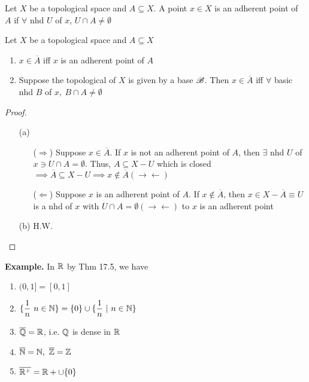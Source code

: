 \begin{defn}
	Let $X$ be a topological space and $A \subseteq X$. A point $x \in X$ is an adherent point of $A$ if $\forall$ nhd $U$ of $x$, $U \cap A \neq \emptyset$ 
\end{defn}

\begin{thm*}[17.5]
	Let $X$ be a topological space and $A \subseteq X$
	
	\begin{enumerate}
		\item $x \in \overline{A}$ iff $x$ is an adherent point of $A$
		\item Suppose the topological of $X$ is given by a base $\mathscr{B}$. Then $x \in \overline{A}$ iff $\forall$ basic nhd $B$ of $x,~B \cap A \neq \emptyset$
	\end{enumerate}
\end{thm*}

\begin{proof}$ $
	\begin{enumerate}
		\item[(a)]
		\begin{enumerate}
		\item[($\Rightarrow$)] Suppose $x \in \overline{A}$. If $x$ is not an adherent point of $A$, then $\exists$ nhd $U$ of $x \ni U \cap A = \emptyset$. Thus, $A \subseteq X - U$ which is closed $\implies \overline{A} \subseteq X - U \implies x \notin \overline{A} (\rightarrow\leftarrow)$ 
		\item[($\Leftarrow$)] Suppose $x$ is an adherent point of $A$. If $x \notin \overline{A}$, then $x \in X-\overline{A} \equiv U$ is a nhd of $x$ with $U \cap A = \emptyset (\rightarrow\leftarrow)$ to $x$ is an adherent point
		\end{enumerate}
		\item[(b)] H.W.
	\end{enumerate}
\end{proof}

\textbf{Example.} In $\mathbb{R}$ by Thm 17.5, we have

\begin{enumerate}[label = $\bullet$]
	\item $(0,1] = [0,1]$
	\item $\{\dfrac{1}{n}~n \in \mathbb{N}\} = \{0\} \cup \{\dfrac{1}{n}~|~ n \in \mathbb{N}\}$
	\item $\overline{\mathbb{Q}} = \mathbb{R}$, i.e. $\mathbb{Q}$ is dense in $\mathbb{R}$
	\item $\overline{\mathbb{N}} = \mathbb{N},~\overline{\mathbb{Z}} = \mathbb{Z}$
	\item $\overline{\mathbb{R}^+} = \mathbb{R}+ \cup \{0\}$
\end{enumerate}


